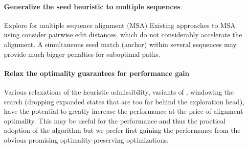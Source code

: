 \paragraph{Generalize the seed heuristic to multiple sequences}
Explore \A for multiple sequence alignment (MSA) Existing approaches to MSA
using \A consider pairwise edit distances, which do not considerably accelerate
the alignment. A simultaneous seed match (anchor) within several sequences may
provide much bigger penalties for suboptimal paths.

\paragraph{Relax the \A optimality guarantees for performance gain}
Various relaxations of the heuristic admissibility, variants of \A, windowing
the search (dropping expanded states that are too far behind the exploration
head), have the potential to greatly increase the performance at the price of
alignment optimality. This may be useful for the performance and thus the
practical adoption of the algorithm but we prefer first gaining the performance
from the obvious promising optimality-preserving optimizations.

%
